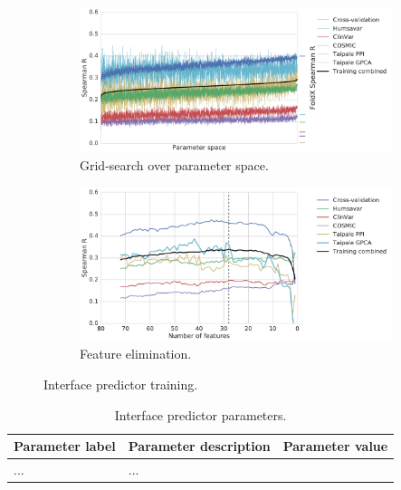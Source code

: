 \begin{figure}[ht]
	\centering

	\begin{subfigure}[b]{1.0\textwidth}
		\centering
		\includegraphics[width=0.6\linewidth]{static/elaspic_training_set/machine_learning/gridsearch_interface.pdf}
		\caption{Grid-search over parameter space.}
		\label{fig:gridsearch_interface}
	\end{subfigure}

	\begin{subfigure}[b]{1\textwidth}
		\centering
		\includegraphics[width=0.75\linewidth]{static/elaspic_training_set/machine_learning/feature_elimination_interface.pdf}
		\caption{Feature elimination.}
		\label{fig:feature_elimination_interface}
	\end{subfigure}

	\caption{Interface predictor training.}
\end{figure}



\begin{table}[ht]
\caption{Interface predictor parameters.} \label{tab:interface_parameters}
\begin{tabular}{l | l | l}
	\toprule
	Parameter label & Parameter description & Parameter value \\
	\midrule
	... & ... \\
	\bottomrule
\end{tabular}
\end{table}


